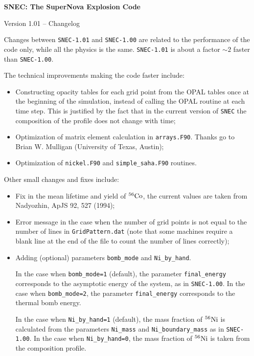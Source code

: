 \documentclass[11pt,letter]{article}
\begin{document}
\begin{center}
\large \bf SNEC: The SuperNova Explosion Code
\normalsize \rm

Version 1.01 -- Changelog


\end{center}


Changes between \texttt{SNEC-1.01} and \texttt{SNEC-1.00} are related
to the performance of the code only, while all the physics is the
same. \texttt{SNEC-1.01} is about a factor $\sim 2$ faster than
\texttt{SNEC-1.00}.

The technical improvements making the code faster include:

\begin{itemize}
\item Constructing opacity tables for each grid point from the OPAL
tables once at the beginning of the simulation, instead of calling the
OPAL routine at each time step. This is justified by the fact that
in the current version of \texttt{SNEC} the composition of the profile
does not change with time;

\item Optimization of matrix element calculation in
  \texttt{arrays.F90}. Thanks go to Brian W. Mulligan (University of
  Texas, Austin);

\item Optimization of \texttt{nickel.F90} and \texttt{simple\_saha.F90} routines.
\end{itemize}

Other small changes and fixes include:

\begin{itemize}
\item Fix in the mean lifetime and yield of $^{56}{\rm Co}$, the
  current values are taken from Nadyozhin, ApJS 92, 527 (1994);

\item Error message in the case when the number of grid points is not equal
 to the number of lines in \texttt{GridPattern.dat} (note that some machines
require a blank line at the end of the file to count the number of lines correctly);

\item Adding (optional) parameters \texttt{bomb\_mode} and \texttt{Ni\_by\_hand}. 

In the case when \texttt{bomb\_mode=1} (default), the parameter \texttt{final\_energy} 
corresponds to the asymptotic energy of the system, as in \texttt{SNEC-1.00}.
In the case when \texttt{bomb\_mode=2}, the parameter 
\texttt{final\_energy} corresponds to the thermal bomb energy.

In the case when \texttt{Ni\_by\_hand=1} (default), the mass fraction of $^{56}{\rm Ni}$ is
calculated from the parameters \texttt{Ni\_mass} and \texttt{Ni\_boundary\_mass} as
in \texttt{SNEC-1.00}. In the case when \texttt{Ni\_by\_hand=0}, the mass fraction of 
$^{56}{\rm Ni}$ is taken from the composition profile.

\end{itemize}

\thispagestyle{empty}
\end{document}
